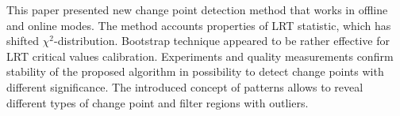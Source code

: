 This paper presented new change point detection method that works in offline  and online modes. The method accounts properties of LRT statistic, which has shifted $\chi^2$-distribution. Bootstrap technique appeared to be rather effective for  LRT  critical values calibration. Experiments and quality measurements confirm stability of the proposed algorithm in possibility to detect change points with different significance. The introduced concept of patterns allows to reveal different types of change point and filter regions with outliers.          